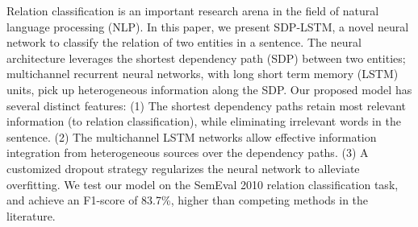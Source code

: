 Relation classification is an important research arena in the field of natural language processing (NLP). In this paper, we present SDP-LSTM, a novel neural network to classify the relation of two entities in a sentence. The neural architecture leverages the shortest dependency path (SDP) between two entities; multichannel recurrent neural networks, with long short term memory (LSTM) units, pick up heterogeneous information along the SDP. Our proposed model has several distinct features: (1) The shortest dependency paths retain most relevant information (to relation classification), while eliminating irrelevant words in the sentence. (2) The multichannel LSTM networks allow effective information integration from heterogeneous sources over the dependency paths. (3) A customized dropout strategy regularizes the neural network to alleviate overfitting. We test our model on the SemEval 2010 relation classification task, and achieve an F1-score of 83.7\%, higher than competing methods in the literature.
